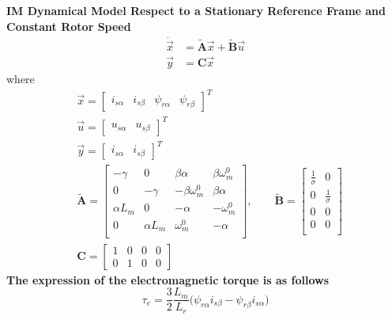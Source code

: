 \documentclass[11pt,a4paper,oneside]{book}
\numberwithin{equation}{section}
\theoremstyle{it}
\theoremstyle{definition}
\begin{document}
\begin{mybox}
	\textbf{IM Dynamical Model Respect to a Stationary Reference Frame and 
		Constant Rotor Speed}
	\begin{equation}\label{im_eq_36}
		\begin{aligned}
			\dot{\vec{x}} &=\tilde{\mathbf{A}}\vec{x}+\tilde{\mathbf{B}}\vec{u} 
			\\[6pt]
			{\vec{y}} &={\mathbf{C}}\vec{x}
		\end{aligned}
	\end{equation}
	where
	\begin{equation}\label{im_eq_37}
		\begin{aligned}
			&\vec{x} = \begin{bmatrix} 
				i_{s\alpha}&i_{s\beta}&\psi_{r\alpha}&\psi_{r\beta} 
			\end{bmatrix}^T\\[6pt]
			&\vec{u} = \begin{bmatrix} u_{s\alpha}&u_{s\beta} 
			\end{bmatrix}^T\\[6pt]
			&\vec{y} = \begin{bmatrix} i_{s\alpha}&i_{s\beta} 
			\end{bmatrix}^T\\[6pt]
			&\tilde{\mathbf{A}} = \begin{bmatrix}
				-\gamma&0&\beta\alpha&\beta\omega_m^0 \\[6pt]			
				0&-\gamma&-\beta\omega_m^0&\beta\alpha \\[6pt]
				\alpha L_m&0&-\alpha&-\omega_m^0 \\[6pt]
				0&\alpha L_m&\omega_m^0&-\alpha \\[6pt]
			\end{bmatrix},\qquad
			\tilde{\mathbf{B}} = \begin{bmatrix}
				\frac{1}{\sigma}&0 \\[6pt]			
				0&\frac{1}{\sigma} \\[6pt]
				0&0 \\[6pt]
				0&0 \\[6pt]
			\end{bmatrix} \\[6pt]
			&\mathbf{C} = \begin{bmatrix}
				1&0&0&0 \\[6pt]			
				0&1&0&0	
			\end{bmatrix}
		\end{aligned}
	\end{equation}
	\textbf{The expression of the electromagnetic torque is as follows}
	\begin{equation}\label{im_eq_38}
		\tau_e = \frac{3}{2}\frac{L_m}{L_r}\Big(\psi_{r\alpha}i_{s\beta} - 
		\psi_{r\beta}i_{s\alpha}\Big)
	\end{equation}
\end{mybox}
\end{document}
